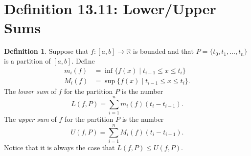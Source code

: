 \documentclass[openany, amssymb, psamsfonts]{amsart}
\newcommand{\bbR}{\mathbb{R}}
\theoremstyle{definition}
\newtheorem{defn}{Definition}[section]
\numberwithin{equation}{section}
\begin{document}
\section*{Definition 13.11: Lower/Upper Sums}
\begin{defn}
\label{13.11}
	Suppose that $f\colon [a, b] \to \bbR$ is bounded and that $P = \{t_0, t_1, \dots, t_n\}$ is a partition of $[a, b]$. Define
	\begin{align*}
		m_i(f) & = \inf \{ f(x) \mid t_{i - 1} \leq x \leq t_i \} \\
		M_i(f) & = \sup \{ f(x) \mid t_{i - 1} \leq x \leq t_i \}.
	\end{align*}
	The \emph{lower sum} of $f$ for the partition $P$ is the number
	\[
		L(f, P) = \sum_{i = 1}^n m_i(f) (t_i - t_{i - 1}).
	\]
	The \emph{upper sum} of $f$ for the partition $P$ is the number
	\[
		U(f, P) = \sum_{i = 1}^n M_i(f) (t_i - t_{i - 1}).
	\]
 Notice that it is always the case that $L(f, P) \leq U(f, P)$. 
\end{defn}
\end{document}
